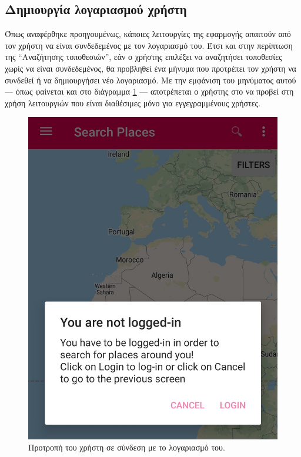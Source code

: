 \documentclass[oneside, 12pt]{book}
\begin{document}
\subsection{Δημιουργία λογαριασμού χρήστη}
Όπως αναφέρθηκε προηγουμένως, κάποιες λειτουργίες της εφαρμογής 
απαιτούν από τον χρήστη να είναι συνδεδεμένος με τον λογαριασμό του. 
Έτσι και στην περίπτωση της ``Αναζήτησης τοποθεσιών'', εάν ο χρήστης 
επιλέξει να αναζητήσει τοποθεσίες χωρίς να είναι συνδεδεμένος, θα 
προβληθεί ένα μήνυμα που προτρέπει τον χρήστη να συνδεθεί ή να 
δημιουργήσει νέο λογαριασμό. Με την εμφάνιση του μηνύματος αυτού --- όπως φαίνεται και στο διάγραμμα \ref{fig:login_prompt} --- αποτρέπεται ο χρήστης στο να προβεί στη χρήση λειτουργιών που είναι διαθέσιμες μόνο για εγγεγραμμένους χρήστες.
\begin{figure}[h]
  \centering
  \includegraphics[scale=0.15]{images/login_prompt.jpg}
  \caption{\label{fig:login_prompt}Προτροπή του χρήστη σε σύνδεση με το λογαριασμό του.}
\end{figure}
\end{document}
